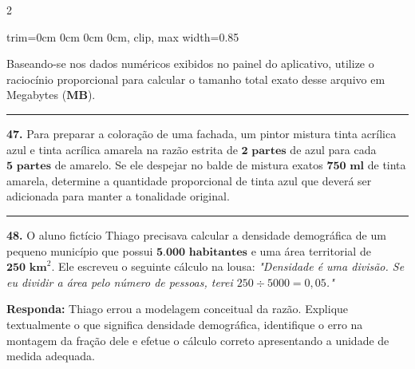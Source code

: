 \documentclass[twoside, 10pt, a4paper]{article}
\newlength{\espacoPreQuestao}\setlength{\espacoPreQuestao}{0.1cm}
\newlength{\espacoQuestao}\setlength{\espacoQuestao}{0.2cm}
\newcommand{\larguraTikz}{0.85\linewidth}
\begin{document}
\begin{multicols*}{2}
\begin{center}
\begin{adjustbox}{trim=0cm 0cm 0cm 0cm, clip, max width=\larguraTikz}
\end{adjustbox}
\end{center}
Baseando-se nos dados numéricos exibidos no painel do aplicativo, utilize o raciocínio proporcional para calcular o tamanho total exato desse arquivo em Megabytes ($ \textbf{MB} $).
\par\vspace{\espacoQuestao}

\noindent\textcolor{CorLinha}{\rule{\linewidth}{0.5pt}} 
\par\vspace{\espacoPreQuestao}
\textbf{47.} Para preparar a coloração de uma fachada, um pintor mistura tinta acrílica azul e tinta acrílica amarela na razão estrita de $ \textbf{2 partes} $ de azul para cada $ \textbf{5 partes} $ de amarelo. Se ele despejar no balde de mistura exatos $ \textbf{750 ml} $ de tinta amarela, determine a quantidade proporcional de tinta azul que deverá ser adicionada para manter a tonalidade original.
\par\vspace{\espacoQuestao}

\noindent\textcolor{CorLinha}{\rule{\linewidth}{0.5pt}} 
\par\vspace{\espacoPreQuestao}
\textbf{48.} O aluno fictício Thiago precisava calcular a densidade demográfica de um pequeno município que possui $ \textbf{5.000 habitantes} $ e uma área territorial de $ \textbf{250 km}^{2} $. Ele escreveu o seguinte cálculo na lousa:
\textit{"Densidade é uma divisão. Se eu dividir a área pelo número de pessoas, terei $ 250 \div 5000 = 0,05 $."}
\begin{boxresponda}
\textbf{Responda:} Thiago errou a modelagem conceitual da razão. Explique textualmente o que significa densidade demográfica, identifique o erro na montagem da fração dele e efetue o cálculo correto apresentando a unidade de medida adequada.
\end{boxresponda}
\par\vspace{\espacoQuestao}


\end{multicols*}
\end{document}
